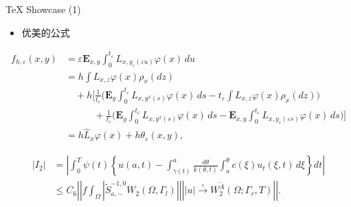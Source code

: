 \documentclass[dvipsnames, svgnames,
               mode=present, paper=screen,
               size=9pt, style=husky]{powerdot}
\newcommand{\wt}{\widetilde}
\newcommand{\wh}{\widehat}
\newcommand{\envert}[1]{\left\lvert#1\right\rvert}
\let\abs=\envert
\begin{document}
\begin{slide}{\TeX{} Showcase (1)}
  \begin{itemize}
  \item 优美的公式
  \end{itemize}
  \begin{equation}
\begin{split}
f_{h,\varepsilon}(x,y)
&=\varepsilon\mathbf{E}_{x,y}\int_0^{t_\varepsilon}
L_{x,y_\varepsilon(\varepsilon u)}\varphi(x)\,du\\
&= h\int L_{x,z}\varphi(x)\rho_x(dz)\\
&\quad+h\biggl[\frac{1}{t_\varepsilon}\biggl(\mathbf{E}_{y}
  \int_0^{t_\varepsilon}L_{x,y^x(s)}\varphi(x)\,ds
  -t_\varepsilon\int L_{x,z}\varphi(x)\rho_x(dz)\biggr)\\
&\phantom{{=}+h\biggl[}+\frac{1}{t_\varepsilon}
  \biggl(\mathbf{E}_{y}\int_0^{t_\varepsilon}L_{x,y^x(s)}
    \varphi(x)\,ds -\mathbf{E}_{x,y}\int_0^{t_\varepsilon}
   L_{x,y_\varepsilon(\varepsilon s)}
   \varphi(x)\,ds\biggr)\biggr]\\
&=h\wh{L}_x\varphi(x)+h\theta_\varepsilon(x,y),
\end{split}
\end{equation} 

\begin{equation}
\begin{split}
 \abs{I_2}&=\left\lvert \int_{0}^T \psi(t)\left\{u(a,t)-\int_{\gamma(t)}^a
  \frac{d\theta}{k(\theta,t)}
  \int_{a}^\theta c(\xi)u_t(\xi,t)\,d\xi\right\}dt\right\rvert\\
&\le C_6\left\lvert \left\lvert f\int_\Omega\left\lvert \wt{S}^{-1,0}_{a,-}
  W_2(\Omega,\Gamma_l)\right\rvert\right\rvert
  \left\lvert \abs{u}\overset{\circ}\to W_2^{\wt{A}}
  (\Omega;\Gamma_r,T)\right\rvert\right\rvert.
\end{split}
\end{equation}
\end{slide}
\end{document}
